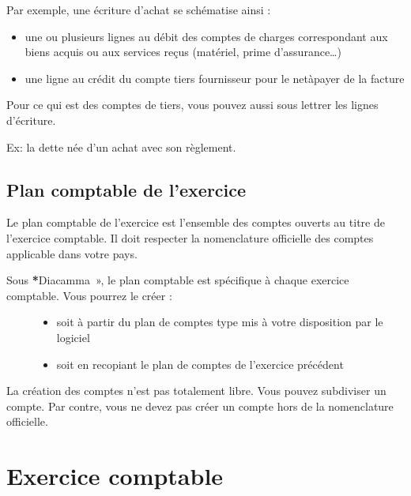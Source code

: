 \documentclass[a4paper,10pt,oneside,french]{sphinxmanual}
\begin{document}
Par exemple, une écriture d’achat se schématise ainsi :
\begin{itemize}
\item {} 
une ou plusieurs lignes au débit des comptes de charges correspondant aux biens acquis ou aux services reçus (matériel, prime d’assurance…)

\item {} 
une ligne au crédit du compte tiers fournisseur pour le net\sphinxhyphen{}à\sphinxhyphen{}payer de la facture

\end{itemize}

Pour ce qui est des comptes de tiers, vous pouvez aussi sous  lettrer les lignes d’écriture.

Ex: la dette née d’un achat avec son règlement.


\subsection{Plan comptable de l’exercice}
\label{\detokenize{accounting/definition:plan-comptable-de-l-exercice}}
Le plan comptable de l’exercice est l’ensemble des comptes ouverts au titre de l’exercice comptable. Il doit respecter  la nomenclature officielle des comptes applicable dans votre pays.
\begin{description}
\item[{Sous {\color{red}\bfseries{}*}Diacamma », le plan comptable est spécifique à chaque exercice comptable. Vous pourrez le créer :}] \leavevmode\begin{itemize}
\item {} 
soit  à partir du plan de comptes type mis à votre disposition par le logiciel

\item {} 
soit en recopiant le plan de comptes de l’exercice précédent

\end{itemize}

\end{description}

La création des comptes n’est pas totalement libre. Vous pouvez subdiviser un compte. Par contre, vous ne devez pas créer un compte hors de la nomenclature officielle.


\section{Exercice comptable}
\label{\detokenize{accounting/fiscalyear:exercice-comptable}}\label{\detokenize{accounting/fiscalyear::doc}}
\end{document}
